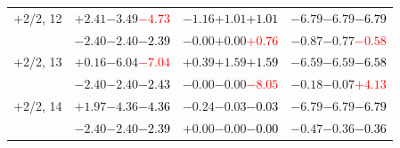 \documentclass[compress]{beamer}
\begin{document}
\begin{frame}
\begin{tabular}{r | c | c | c}
$+$2/2, 12 & $+2.41$\hspace{0.1 cm}$-3.49$\hspace{0.1 cm}\textcolor{red}{$-4.73$} & $-1.16$\hspace{0.1 cm}$+1.01$\hspace{0.1 cm}\textcolor{black}{$+1.01$} & $-6.79$\hspace{0.1 cm}$-6.79$\hspace{0.1 cm}\textcolor{black}{$-6.79$} \\
           & $-2.40$\hspace{0.1 cm}$-2.40$\hspace{0.1 cm}\textcolor{black}{$-2.39$} & $-0.00$\hspace{0.1 cm}$+0.00$\hspace{0.1 cm}\textcolor{red}{$+0.76$} & $-0.87$\hspace{0.1 cm}$-0.77$\hspace{0.1 cm}\textcolor{red}{$-0.58$} \\
$+$2/2, 13 & $+0.16$\hspace{0.1 cm}$-6.04$\hspace{0.1 cm}\textcolor{red}{$-7.04$} & $+0.39$\hspace{0.1 cm}$+1.59$\hspace{0.1 cm}\textcolor{black}{$+1.59$} & $-6.59$\hspace{0.1 cm}$-6.59$\hspace{0.1 cm}\textcolor{black}{$-6.58$} \\
           & $-2.40$\hspace{0.1 cm}$-2.40$\hspace{0.1 cm}\textcolor{black}{$-2.43$} & $-0.00$\hspace{0.1 cm}$-0.00$\hspace{0.1 cm}\textcolor{red}{$-8.05$} & $-0.18$\hspace{0.1 cm}$-0.07$\hspace{0.1 cm}\textcolor{red}{$+4.13$} \\
$+$2/2, 14 & $+1.97$\hspace{0.1 cm}$-4.36$\hspace{0.1 cm}\textcolor{black}{$-4.36$} & $-0.24$\hspace{0.1 cm}$-0.03$\hspace{0.1 cm}\textcolor{black}{$-0.03$} & $-6.79$\hspace{0.1 cm}$-6.79$\hspace{0.1 cm}\textcolor{black}{$-6.79$} \\
           & $-2.40$\hspace{0.1 cm}$-2.40$\hspace{0.1 cm}\textcolor{black}{$-2.39$} & $+0.00$\hspace{0.1 cm}$-0.00$\hspace{0.1 cm}\textcolor{black}{$-0.00$} & $-0.47$\hspace{0.1 cm}$-0.36$\hspace{0.1 cm}\textcolor{black}{$-0.36$} \\

\end{tabular}
\end{frame}
\end{document}
